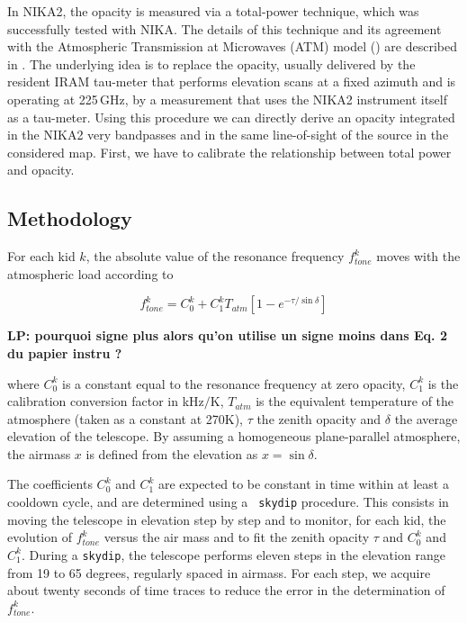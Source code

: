
In NIKA2, the opacity is measured via a total-power technique, which was successfully tested with NIKA. The details of this technique and its agreement with the Atmospheric Transmission at Microwaves (ATM) model (\cite{2001IEEE....49.1683C}) are described in \cite{Catalano:2014nml}. The underlying idea is to replace the opacity, usually delivered by the resident IRAM tau-meter that performs elevation scans at a fixed azimuth and is operating at 225\,GHz, by a measurement that uses the NIKA2 instrument itself as a tau-meter. Using this procedure we can directly derive an opacity integrated in the NIKA2 very bandpasses and in the same line-of-sight of the source in the considered map. First, we have to calibrate the relationship between total power and opacity.

\subsection{Methodology}
For each kid $k$, the absolute value of the resonance frequency
$f_{tone}^k$ moves with the atmospheric load according to

\begin{equation}
f_{tone}^k = C_0^k + C_1^k T_{atm}[1-e^{-\tau/\sin\delta}]
\end{equation}

{\bf LP: pourquoi signe plus alors qu'on utilise un signe moins dans
  Eq. 2 du papier instru ?}

where $C_0^k$ is a constant equal to the resonance
frequency at zero opacity, $C_1^k$ is the calibration conversion
factor in kHz$/$K, $T_{atm}$ is the equivalent temperature
of the atmosphere (taken as a constant at 270K), $\tau$ the zenith
opacity and $\delta$ the average elevation of the telescope.
By assuming a homogeneous plane-parallel atmosphere, the airmass $x$ is defined from the
elevation as $x = \sin\delta$. 

The coefficients $C_0^k$ and $C_1^k$ are expected to be constant in time
within at least a cooldown cycle, and are determined using a {\tt
  skydip} procedure. This consists in moving
the telescope in elevation step by step and to monitor, for each kid, the
evolution of $f_{tone}^k$ versus the air mass and to fit the zenith opacity $\tau$ and
$C_0^k$ and $C_1^k$. During a {\tt skydip}, the telescope performs
eleven  steps in the elevation range from 19 to 65 degrees, regularly
spaced in airmass. For each step, we acquire about twenty seconds of
time traces to reduce the error in the determination of $f_{tone}^k$.

